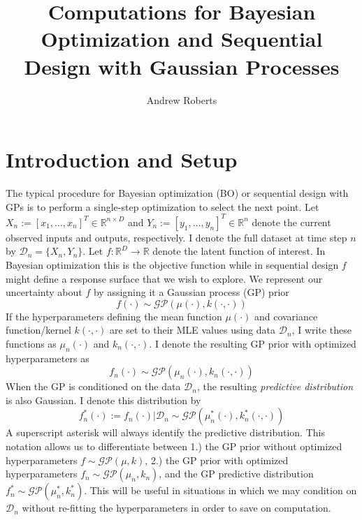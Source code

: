 \documentclass[12pt]{article}
\title{Computations for Bayesian Optimization and Sequential Design with Gaussian Processes}
\author{Andrew Roberts}
\newcommand{\R}{\mathbb{R}}
\begin{document}
\maketitle
\tableofcontents
\newpage

\section{Introduction and Setup}
The typical procedure for Bayesian optimization (BO) or sequential design with GPs is to perform a single-step optimization to select the next point. Let 
$X_n := [x_1, \dots, x_n]^T \in \R^{n \times D}$  and $Y_n := [y_1, \dots, y_n]^T \in \R^n$ denote the current observed inputs and outputs, respectively. I denote 
the full dataset at time step $n$ by $\mathcal{D}_n = \{X_n, Y_n\}$. Let $f: \R^D \to \R$ denote the latent function of interest. In Bayesian optimization this is the 
objective function while in sequential design $f$ might define a response surface that we wish to explore. We represent our uncertainty about $f$ by assigning it 
a Gaussian process (GP) prior 
\[f(\cdot) \sim \mathcal{GP}(\mu(\cdot), k(\cdot, \cdot))\]
If the hyperparameters defining the mean function $\mu(\cdot)$ and covariance function/kernel $k(\cdot, \cdot)$ are set to their MLE values using data $\mathcal{D}_n$, I write these 
functions as $\mu_n(\cdot)$ and $k_n(\cdot, \cdot)$. I denote the resulting GP prior with optimized hyperparameters as 
\[f_n(\cdot) \sim \mathcal{GP}(\mu_n(\cdot), k_n(\cdot, \cdot))\]
When the GP is conditioned on the data $\mathcal{D}_n$, the resulting \textit{predictive distribution} is also Gaussian. I denote this distribution by 
\[f_n^*(\cdot) := f_n(\cdot)|\mathcal{D}_n \sim \mathcal{GP}(\mu^*_n(\cdot), k^*_n(\cdot, \cdot))\]
A superscript asterisk will always identify the predictive distribution. This notation allows us to differentiate between 1.) the GP prior without optimized 
hyperparameters $f \sim \mathcal{GP}(\mu, k)$, 2.) the GP prior with optimized hyperparameters $f_n \sim \mathcal{GP}(\mu_n, k_n)$, and the GP predictive distribution 
$f_n^* \sim \mathcal{GP}(\mu_n^*, k_n^*)$. This will be useful in 
situations in which we may condition on $\mathcal{D}_n$ without re-fitting the hyperparameters in order to save on computation. 
\end{document}
